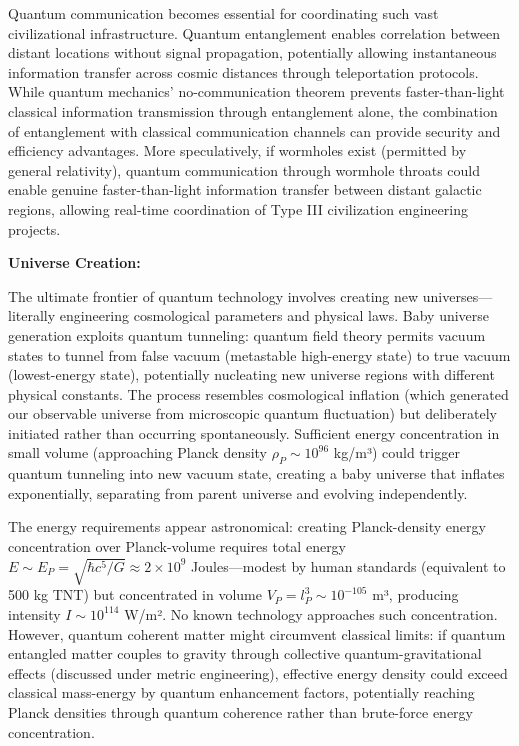 \documentclass[11pt,a4paper,twoside]{article}
\begin{document}
Quantum communication becomes essential for coordinating such vast civilizational infrastructure. Quantum entanglement enables correlation between distant locations without signal propagation, potentially allowing instantaneous information transfer across cosmic distances through teleportation protocols. While quantum mechanics' no-communication theorem prevents faster-than-light classical information transmission through entanglement alone, the combination of entanglement with classical communication channels can provide security and efficiency advantages. More speculatively, if wormholes exist (permitted by general relativity), quantum communication through wormhole throats could enable genuine faster-than-light information transfer between distant galactic regions, allowing real-time coordination of Type III civilization engineering projects.

\textbf{Universe Creation:}

The ultimate frontier of quantum technology involves creating new universes---literally engineering cosmological parameters and physical laws. Baby universe generation exploits quantum tunneling: quantum field theory permits vacuum states to tunnel from false vacuum (metastable high-energy state) to true vacuum (lowest-energy state), potentially nucleating new universe regions with different physical constants. The process resembles cosmological inflation (which generated our observable universe from microscopic quantum fluctuation) but deliberately initiated rather than occurring spontaneously. Sufficient energy concentration in small volume (approaching Planck density $\rho_P \sim 10^{96}$ kg/m³) could trigger quantum tunneling into new vacuum state, creating a baby universe that inflates exponentially, separating from parent universe and evolving independently.

The energy requirements appear astronomical: creating Planck-density energy concentration over Planck-volume requires total energy $E \sim E_P = \sqrt{\hbar c^5/G} \approx 2 \times 10^9$ Joules---modest by human standards (equivalent to 500 kg TNT) but concentrated in volume $V_P = l_P^3 \sim 10^{-105}$ m³, producing intensity $I \sim 10^{114}$ W/m². No known technology approaches such concentration. However, quantum coherent matter might circumvent classical limits: if quantum entangled matter couples to gravity through collective quantum-gravitational effects (discussed under metric engineering), effective energy density could exceed classical mass-energy by quantum enhancement factors, potentially reaching Planck densities through quantum coherence rather than brute-force energy concentration.
\end{document}
